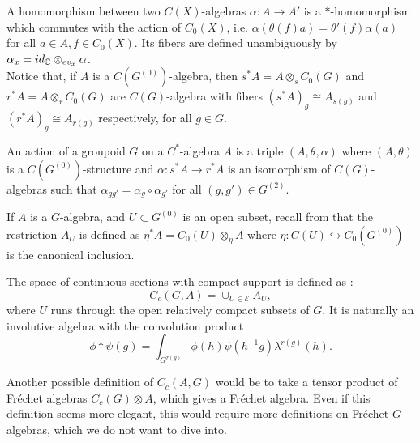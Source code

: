 A homomorphism between two $C(X)$-algebras $\alpha : A\rightarrow A'$ is a $*$-homomorphism which commutes with the action of $C_0(X)$, i.e. $\alpha(\theta(f)a)=\theta'(f)\alpha(a)$ for all $a\in A,f\in C_0(X)$. Its fibers are defined unambiguously by $\alpha_x = id_\mathbb C \otimes_{ev_x} \alpha$.\\

Notice that, if $A$ is a $C(G^{(0)})$-algebra, then $s^* A = A \otimes_s C_0(G)$ and $r^* A = A \otimes_r C_0(G)$ are $C(G)$-algebra with fibers $(s^*A)_g \cong A_{s(g)}$ and $(r^*A)_g \cong A_{r(g)}$ respectively, for all $g\in G$.

\begin{definition}
An action of a groupoid $G$ on a $C^*$-algebra $A$ is a triple $(A,\theta,\alpha)$ where $(A,\theta)$ is a $C(G^{(0)})$-structure and $\alpha : s^* A \rightarrow r^* A$ is an isomorphism of $C(G)$-algebras such that $\alpha_{gg'}= \alpha_g\circ \alpha_{g'}$ for all $(g,g')\in G^{(2)}$.
\end{definition} 

If $A$ is a $G$-algebra, and $U \subset G^{(0)}$ is an open subset, recall from \cite{LeGall} that the restriction $A_U$ is defined as $\eta^* A = C_0(U) \otimes_\eta A$ where $\eta : C(U) \hookrightarrow C_0(G^{(0)})$ is the canonical inclusion. 

The space of continuous sections with compact support is defined as :
\[C_c(G,A) = \cup_{U\in \mathcal E} A_U,\]
where $U$ runs through the open relatively compact subsets of $G$. It is naturally an involutive algebra with the convolution product
\[\phi\ast \psi (g) = \int_{G^{r(g)}} \phi(h)\psi(h^{-1}g)\lambda^{r(g)}(h).\] 

\begin{rk}
Another possible definition of $C_c(A,G)$ would be to take a tensor product of Fréchet algebras $C_c(G)\otimes A$, which gives a Fréchet algebra. Even if this definition seems more elegant, this would require more definitions on Fréchet $G$-algebras, which we do not want to dive into.  
\end{rk}



